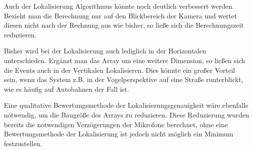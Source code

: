 Auch der Lokalisierung Algorithmus könnte noch deutlich verbessert werden. Bezieht man die Berechnung nur auf den Blickbereich der Kamera und wertet diesen nicht nach der Rechnung aus wie bisher, so ließe sich die Berechnungszeit reduzieren. 

Bisher wird bei der Lokalisierung auch lediglich in der Horizontalen unterschieden. Ergänzt man das Array um eine weitere Dimension, so ließen sich die Events auch in der Vertikalen Lokalisieren. Dies könnte ein großer Vorteil sein, wenn das System z.B. in der Vogelperspektive auf eine Straße runterblickt, wie es häufig auf Autobahnen der Fall ist.

Eine qualitative Bewertungsmethode der Lokalisierungsgenauigkeit wäre ebenfalls notwendig, um die Baugröße des Arrays zu reduzieren. Diese Reduzierung wurden bereits die notwendigen Verzögerungen der Mikrofone berechnet, ohne eine Bewertungsmethode der Lokalisierung ist jedoch nicht möglich ein Minimum festzustellen. 